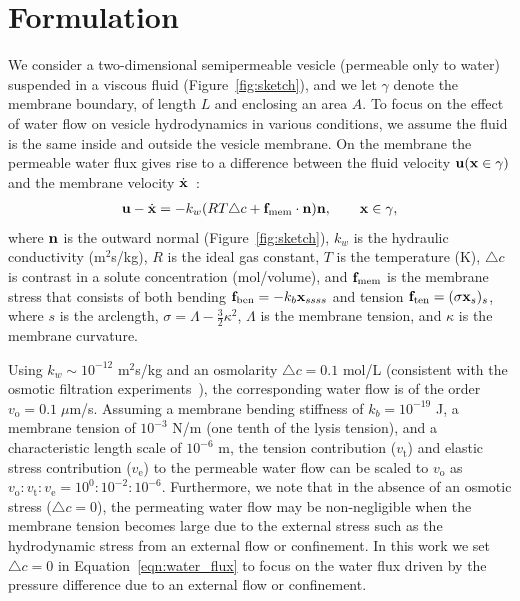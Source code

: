 \documentclass[prb,preprint,showpacs,preprintnumbers,amsmath,amssymb,longbibliography]{revtex4-1}
\begin{document}
\section{Formulation\label{sec:formulation}}
\label{sec:formulation}
We consider a two-dimensional semipermeable vesicle (permeable only to
water) suspended in a viscous fluid (Figure~\ref{fig:sketch}), and we
let $\gamma$ denote the membrane boundary, of length $L$ and enclosing an area $A$.
%
%
To focus on the effect of water flow on vesicle
hydrodynamics in various conditions, we assume the fluid is the same
inside and outside the vesicle membrane. On the membrane the permeable
water flux gives rise to a difference between the fluid velocity
${\mathbf{u}}({\mathbf{x}}\in \gamma)$ and the membrane velocity
$\dot{\mathbf{x}}$~\cite{yao-mor2017}:
\begin{align}
\label{eqn:water_flux}
  \mathbf{u} - \dot{\mathbf{x}} = - k_w (R T \triangle c + \mathbf{f}_\mathrm{mem} \cdot \mathbf{n}) \mathbf{n}, \qquad
  \mathbf{x} \in \gamma,
\end{align}
where $\mathbf{n}$ is the outward normal (Figure~\ref{fig:sketch}), $k_w$ is
the hydraulic conductivity (m$^2$s/kg), $R$ is the ideal gas constant,
$T$ is the temperature (K), $\triangle c$ is contrast in a solute
concentration (mol/volume), and $\mathbf{f}_\mathrm{mem}$ is the membrane
stress that consists of both bending $ \mathbf{f}_\mathrm{ben}= -k_b
\mathbf{x}_{ssss}$ and tension $\mathbf{f}_\mathrm{ten}=(\sigma \mathbf{x}_s)_s$, where $s$
is the arclength, $\sigma = \Lambda - \frac{3}{2}\kappa^2$, $\Lambda$ is the
membrane tension, and $\kappa$ is the membrane curvature. 

Using $k_w\sim 10^{-12}$ m$^2$s/kg 
and an osmolarity $\triangle c = 0.1$ mol/L (consistent with the osmotic
filtration experiments~\cite{OlbrichRawiczNeedhamEtAl2000_BJ}), the
corresponding water flow is of the order $v_\mathrm{o}=0.1 \; \mu$m/s.
Assuming a membrane bending stiffness of $k_b = 10^{-19}$ J, a membrane
tension of $10^{-3}$ N/m (one tenth of the lysis tension), and a
characteristic length scale of $10^{-6}$ m, the tension contribution
($v_\mathrm{t}$) and elastic stress contribution ($v_\mathrm{e}$) to the
permeable water flow can be scaled to $v_\mathrm{o}$ as
$v_\mathrm{o}:v_\mathrm{t}:v_\mathrm{e}=10^{0}:10^{-2}:10^{-6}$.
Furthermore, we note that in the absence of an osmotic stress
($\triangle c = 0$), the permeating water flow may be non-negligible
when the membrane tension becomes large due to the external stress such
as the hydrodynamic stress from an external flow or confinement. In this
work we set $\triangle c = 0$ in Equation~\eqref{eqn:water_flux} to
focus on the water flux driven by the pressure difference due to an
external flow or confinement.
\end{document}
